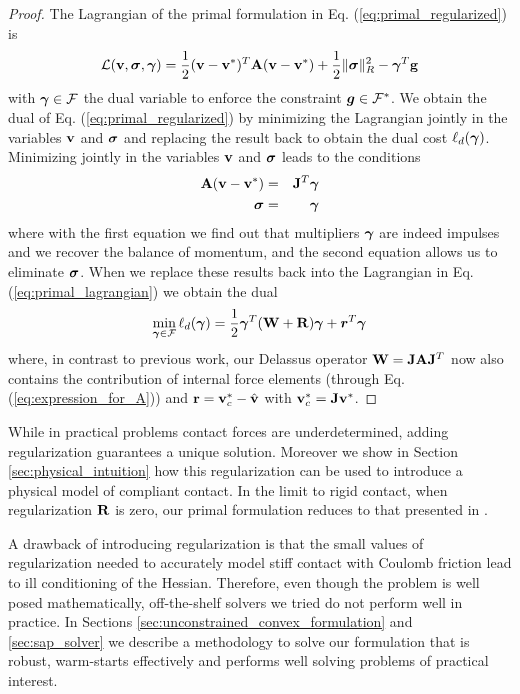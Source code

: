 \begin{proof}
The Lagrangian of the primal formulation in Eq. (\ref{eq:primal_regularized}) is
\begin{equation}
	\mathcal{L}(\mf{v},\bsigma,\vf{\gamma}) = \frac{1}{2}(\mf{v}-\mf{v}^*)^T\mf{A}(\mf{v}-\mf{v}^*) + \frac{1}{2} \Vert\bsigma\Vert_{R}^2 - \vf{\gamma}^T\mf{g}
	\label{eq:primal_lagrangian}
\end{equation}
with ${\bm{\gamma}}\in\mathcal{F}$ the dual variable to enforce the constraint
${\bm{g}}\in \mathcal{F}^*$. We obtain the dual of Eq.
(\ref{eq:primal_regularized}) by minimizing the Lagrangian jointly in the
variables ${\mathbf{v}}$ and ${\bm\sigma}$ and replacing the result back to obtain the
dual cost $\ell_d({\bm{\gamma}})$. Minimizing jointly in the variables ${\mathbf{v}}$
and ${\bm\sigma}$ leads to the conditions
\begin{eqnarray}
	{\mathbf{A}}({\mathbf{v}}-{\mathbf{v}}^*) &=& {\mathbf{J}}^T{\bm{\gamma}}\\
	{\bm{\sigma}} &=& {\bm{\gamma}}
\end{eqnarray}
where with the first equation we find out that multipliers ${\bm\gamma}$ are indeed
impulses and we recover the balance of momentum, and the second equation allows
us to eliminate ${\bm{\sigma}}$. When we replace these results back into the
Lagrangian in Eq. (\ref{eq:primal_lagrangian}) we obtain the dual
\begin{eqnarray}
	\min_{{\bm\gamma}\in \mathcal{F}} \ell_d({\bm\gamma}) =
	\frac{1}{2}{\bm\gamma}^T(\mathbf{W}+\mathbf{R}){\bm\gamma} + {\bm r}^T
	{\bm\gamma}
\end{eqnarray}
where, in contrast to previous work, our Delassus operator
${\mathbf{W}}={\mathbf{J}}{\mathbf{A}}{\mathbf{J}}^T$ now also contains the contribution of internal
force elements (through Eq. (\ref{eq:expression_for_A})) and
${\mathbf{r}}={\mathbf{v}}_c^*-\hat{{\mathbf{v}}}$ with ${\mathbf{v}}_c^*={\mathbf{J}}{\mathbf{v}}^*$.
\end{proof}

While in practical problems contact forces are underdetermined, adding
regularization guarantees a unique solution. Moreover we show in Section
\ref{sec:physical_intuition} how this regularization can be used to introduce a
physical model of compliant contact. In the limit to rigid contact, when
regularization ${\mathbf{R}}$ is zero, our primal formulation reduces to that
presented in \cite{bib:mazhar2014}.

A drawback of introducing regularization is that the small values of
regularization needed to accurately model stiff contact with Coulomb friction
lead to ill conditioning of the Hessian. Therefore, even though the problem is
well posed mathematically, off-the-shelf solvers we tried do not perform well in
practice. In Sections \ref{sec:unconstrained_convex_formulation} and
\ref{sec:sap_solver} we describe a methodology to solve our formulation that is
robust, warm-starts effectively and performs well solving problems of practical
interest.
